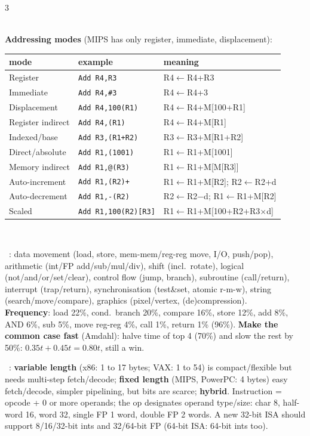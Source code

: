 \documentclass[landscape]{article}
\newcommand{\sub}[1]{\par\vspace{1pt}{\color{cur}\bfseries #1}\ }
\newcommand{\key}[1]{\textbf{\color{BrickRed}#1}}
\newcommand{\tc}[1]{\texttt{#1}}
\begin{document}
\begin{multicols*}{3}
\begin{tikzpicture}[every node/.style={font=\fontsize{5.2}{5.8}\selectfont}]
\end{tikzpicture}\\
\key{Addressing modes} (MIPS has only register, immediate, displacement):\\
{\fontsize{5.6}{6.4}\selectfont\begin{tabular}{@{}lll@{}}\toprule
mode & example & meaning\\\midrule
Register & \tc{Add R4,R3} & R4$\leftarrow$R4+R3\\
Immediate & \tc{Add R4,\#3} & R4$\leftarrow$R4+3\\
Displacement & \tc{Add R4,100(R1)} & R4$\leftarrow$R4+M[100+R1]\\
Register indirect & \tc{Add R4,(R1)} & R4$\leftarrow$R4+M[R1]\\
Indexed/base & \tc{Add R3,(R1+R2)} & R3$\leftarrow$R3+M[R1+R2]\\
Direct/absolute & \tc{Add R1,(1001)} & R1$\leftarrow$R1+M[1001]\\
Memory indirect & \tc{Add R1,@(R3)} & R1$\leftarrow$R1+M[M[R3]]\\
Auto-increment & \tc{Add R1,(R2)+} & R1$\leftarrow$R1+M[R2]; R2$\leftarrow$R2+d\\
Auto-decrement & \tc{Add R1,-(R2)} & R2$\leftarrow$R2$-$d; R1$\leftarrow$R1+M[R2]\\
Scaled & \tc{Add R1,100(R2)[R3]} & R1$\leftarrow$R1+M[100+R2+R3$\times$d]\\\bottomrule
\end{tabular}}\\
\sub{\#3 Operations}: data movement (load, store, mem-mem/reg-reg move, I/O, push/pop), arithmetic (int/FP add/sub/mul/div), shift (incl.\ rotate), logical (not/and/or/set/clear), control flow (jump, branch), subroutine (call/return), interrupt (trap/return), synchronisation (test\&set, atomic r-m-w), string (search/move/compare), graphics (pixel/vertex, (de)compression).\\
\key{Frequency}: load 22\%, cond.\ branch 20\%, compare 16\%, store 12\%, add 8\%, AND 6\%, sub 5\%, move reg-reg 4\%, call 1\%, return 1\% (96\%). \key{Make the common case fast} (Amdahl): halve time of top 4 (70\%) and slow the rest by 50\%: $0.35t+0.45t=0.80t$, still a win.\\
\sub{\#4 Instruction formats}: \key{variable length} (x86: 1 to 17 bytes; VAX: 1 to 54) is compact/flexible but needs multi-step fetch/decode; \key{fixed length} (MIPS, PowerPC: 4 bytes) easy fetch/decode, simpler pipelining, but bits are scarce; \key{hybrid}. Instruction = opcode + 0 or more operands; the op designates operand type/size: char 8, half-word 16, word 32, single FP 1 word, double FP 2 words. A new 32-bit ISA should support 8/16/32-bit ints and 32/64-bit FP (64-bit ISA: 64-bit ints too).\\

\end{multicols*}
\end{document}
